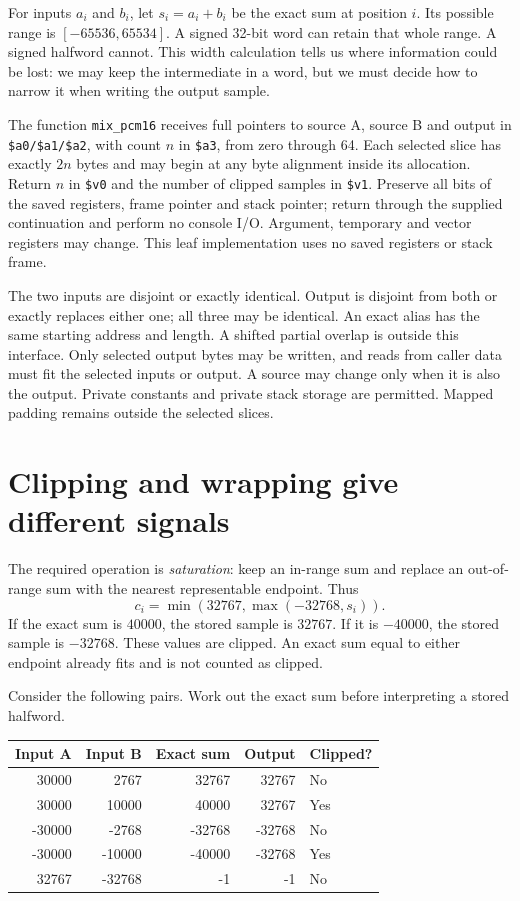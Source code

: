For inputs $a_i$ and $b_i$, let $s_i=a_i+b_i$ be the exact sum at position $i$.
Its possible range is $[-65536,65534]$. A signed 32-bit word can retain that whole
range. A signed halfword cannot. This width calculation tells us where information
could be lost: we may keep the intermediate in a word, but we must decide how to
narrow it when writing the output sample.


The function \texttt{mix\_pcm16} receives full pointers to source A, source B and
output in \texttt{\$a0/\$a1/\$a2}, with count $n$ in \texttt{\$a3}, from zero
through 64. Each selected slice has exactly $2n$ bytes and may begin at any byte
alignment inside its allocation. Return $n$ in \texttt{\$v0} and the number of
clipped samples in \texttt{\$v1}. Preserve all bits of the saved registers, frame
pointer and stack pointer; return through the supplied continuation and perform
no console I/O. Argument, temporary and vector registers may change. This leaf
implementation uses no saved registers or stack frame.

The two inputs are disjoint or exactly identical. Output is disjoint from both
or exactly replaces either one; all three may be identical. An exact alias has
the same starting address and length. A shifted partial overlap is outside this
interface. Only selected output bytes may be written, and reads from caller data
must fit the selected inputs or output. A source may change only when it is also
the output. Private constants and private stack storage are permitted. Mapped
padding remains outside the selected slices.

\section{Clipping and wrapping give different signals}

The required operation is \emph{saturation}: keep an in-range sum and replace an
out-of-range sum with the nearest representable endpoint. Thus
\[
  c_i=\min(32767,\max(-32768,s_i)).
\]
If the exact sum is $40000$, the stored sample is $32767$. If it is $-40000$,
the stored sample is $-32768$. These values are clipped. An exact sum equal to
either endpoint already fits and is not counted as clipped.

Consider the following pairs. Work out the exact sum before interpreting a
stored halfword.
\begin{center}
  \begin{tabular}{rrrrl}
    \toprule
    Input A & Input B & Exact sum & Output & Clipped? \\
    \midrule
    30000   & 2767    & 32767     & 32767  & No       \\
    30000   & 10000   & 40000     & 32767  & Yes      \\
    -30000  & -2768   & -32768    & -32768 & No       \\
    -30000  & -10000  & -40000    & -32768 & Yes      \\
    32767   & -32768  & -1        & -1     & No       \\
    \bottomrule
  \end{tabular}
\end{center}

